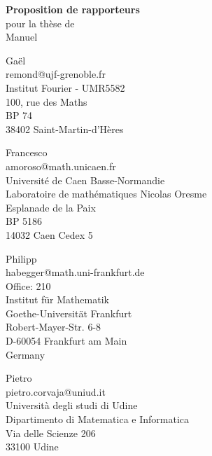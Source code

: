 \documentclass[a4paper, 11pt]{article}
\begin{document}
  \centering \pagestyle{empty}

\begingroup \large
\textbf{Proposition de rapporteurs} \\
pour la thèse de \\
Manuel  \\ [7em]
\endgroup

\begin{minipage}[t]{.5\linewidth} \raggedright
  Gaël  \\
  remond@ujf-grenoble.fr \\ [1ex]
  Institut Fourier - UMR5582 \\
  100, rue des Maths \\
  BP 74 \\
  38402 Saint-Martin-d'Hères
\end{minipage}%
\begin{minipage}[t]{.5\linewidth} \raggedright
  Francesco  \\
  amoroso@math.unicaen.fr \\ [1ex]
  Université de Caen Basse-Normandie \\
  Laboratoire de mathématiques Nicolas Oresme \\
  Esplanade de la Paix \\
  BP 5186 \\
  14032 Caen Cedex 5
\end{minipage}%

\vspace{5em}

\begin{minipage}[t]{.5\linewidth} \raggedright
  Philipp  \\
  habegger@math.uni-frankfurt.de \\ [1ex]
  Office: 210 \\
  Institut für Mathematik \\
  Goethe-Universität Frankfurt \\
  Robert-Mayer-Str. 6-8 \\
  D-60054 Frankfurt am Main \\
  Germany
\end{minipage}%
\begin{minipage}[t]{.5\linewidth} \raggedright
  Pietro  \\
  pietro.corvaja@uniud.it \\ [1ex]
  Università degli studi di Udine \\
  Dipartimento di Matematica e Informatica \\
  Via delle Scienze 206 \\
  33100 Udine \\
\end{minipage}%
\end{document}
